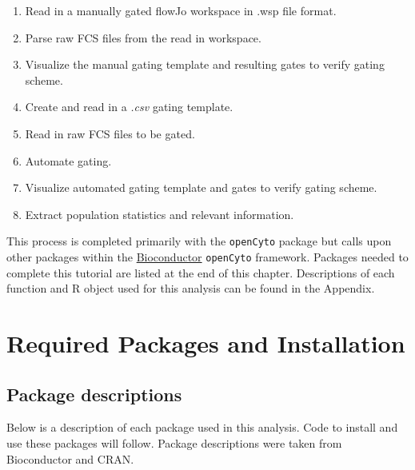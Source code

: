 \documentclass[]{book}
\providecommand{\tightlist}{%
  \setlength{\itemsep}{0pt}\setlength{\parskip}{0pt}}
\begin{document}
\begin{enumerate}
\def\labelenumi{\arabic{enumi}.}
\tightlist
\item
  Read in a manually gated flowJo workspace in .wsp file format.
\item
  Parse raw FCS files from the read in workspace.
\item
  Visualize the manual gating template and resulting gates to verify gating scheme.
\item
  Create and read in a \emph{.csv} gating template.
\item
  Read in raw FCS files to be gated.\\
\item
  Automate gating.
\item
  Visualize automated gating template and gates to verify gating scheme.
\item
  Extract population statistics and relevant information.
\end{enumerate}

This process is completed primarily with the \texttt{openCyto} package but calls upon other packages within the \href{http://bioconductor.org/packages/release/bioc/html/openCyto.html}{Bioconductor} \texttt{openCyto} framework. Packages needed to complete this tutorial are listed at the end of this chapter. Descriptions of each function and R object used for this analysis can be found in the Appendix.

\hypertarget{required-packages-and-installation}{%
\section{Required Packages and Installation}\label{required-packages-and-installation}}

\hypertarget{package-descriptions}{%
\subsection{Package descriptions}\label{package-descriptions}}

Below is a description of each package used in this analysis. Code to install and use these packages will follow. Package descriptions were taken from Bioconductor and CRAN.
\end{document}
